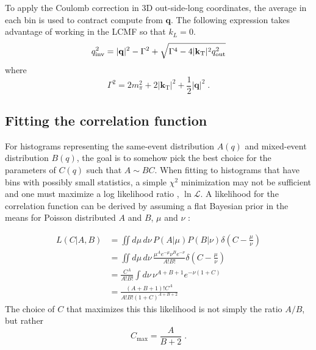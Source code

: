 To apply the Coulomb correction in 3D out-side-long coordinates, the average \kt in each bin is used to contract compute \qinv from $\mathbf{q}$.
The following expression takes advantage of working in the \ac{LCMF} so that $k_L = 0$.
\begin{equation}
q_{\mathrm{inv}}^2 = |\mathbf{q}|^2 - \Gamma^2 + \sqrt{\Gamma^4 - 4 |\mathbf{k}_\mathrm{T}|^2 q_{\mathrm{out}}^2} \label{eqn:q3_to_qinv}
\end{equation}
where
\begin{equation}
\Gamma^2 = 2 m_{\pi}^2 + 2 |\mathbf{k}_\mathrm{T}|^2 + \frac{1}{2}|\mathbf{q}|^2 \; .
\end{equation}



\subsection{Fitting the correlation function}

For histograms representing the same-event distribution $A(q)$ and mixed-event distribution $B(q)$, the goal is to somehow pick the best choice for the parameters of $C(q)$ such that $A \sim B C$.
When fitting to histograms that have bins with possibly small statistics, a simple $\chi^2$ minimization may not be sufficient and one must maximize a log likelihood ratio \cite{Baker1984437}, $\ln\mathcal{L}$.
A likelihood for the correlation function can be derived by assuming a flat Bayesian prior in the means for Poisson distributed $A$ and $B$, $\mu$ and $\nu$ \cite{Soltz:1994PhDT}:

\begin{align}
L(C|A,B) &= \iint d\mu \, d\nu \, P(A|\mu) P(B|\nu) \delta\left(C - \frac{\mu}{\nu} \right)\\
&= \iint d\mu \, d\nu \, \frac{\mu^{A} e^{-\mu} \nu^{B} e^{-\nu}}{A! B!} \delta\left(C - \frac{\mu}{\nu} \right)\\
&= \frac{C^A}{A! B!} \int d\nu \, \nu^{A+B+1} e^{-\nu (1+C)}\\
&= \frac{(A+B+1)! C^A}{A! B! (1+C)^{A+B+2}}
\end{align}
The choice of $C$ that maximizes this this likelihood is not simply the ratio $A/B$, but rather
\begin{equation} C_{\textrm{max}} = \frac{A}{B+2} \; .\end{equation}

